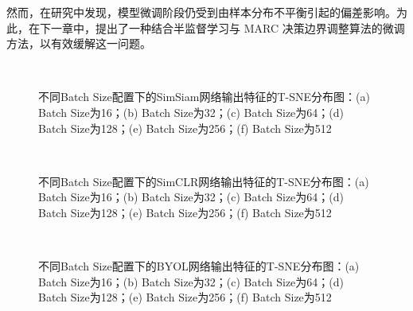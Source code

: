 \documentclass[master]{thesis-uestc}
\begin{document}
然而，在研究中发现，模型微调阶段仍受到由样本分布不平衡引起的偏差影响。为此，在下一章中，提出了一种结合半监督学习与 MARC 决策边界调整算法的微调方法，以有效缓解这一问题。

\begin{figure}
    \centering
    \\
    
    \caption{不同Batch Size配置下的SimSiam网络输出特征的T-SNE分布图：(a) Batch Size为16；(b) Batch Size为32；(c) Batch Size为64；(d) Batch Size为128；(e) Batch Size为256；(f) Batch Size为512}
    \label{tsne_simsiam_diff_batch_size}
\end{figure}

\begin{figure}
    \centering
    \\
    
    \caption{不同Batch Size配置下的SimCLR网络输出特征的T-SNE分布图：(a) Batch Size为16；(b) Batch Size为32；(c) Batch Size为64；(d) Batch Size为128；(e) Batch Size为256；(f) Batch Size为512}
    \label{tsne_simclr_diff_batch_size}
\end{figure}

\begin{figure}
    \centering
    \\
    
    \caption{不同Batch Size配置下的BYOL网络输出特征的T-SNE分布图：(a) Batch Size为16；(b) Batch Size为32；(c) Batch Size为64；(d) Batch Size为128；(e) Batch Size为256；(f) Batch Size为512}
    \label{tsne_byol_diff_batch_size}
\end{figure}
\end{document}
